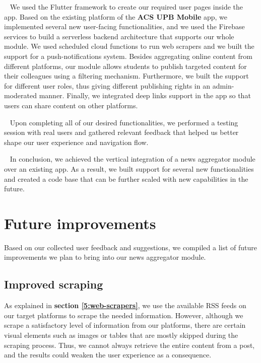 ~
We used the Flutter framework to create our required user pages inside the app. Based on the existing platform of the \textbf{ACS UPB Mobile} app, we implemented several new user-facing functionalities, and we used the Firebase services to build a serverless backend architecture that supports our whole module. We used scheduled cloud functions to run web scrapers and we built the support for a push-notifications system. Besides aggregating online content from different platforms, our module allows students to publish targeted content for their colleagues using a filtering mechanism. Furthermore, we built the support for different user roles, thus giving different publishing rights in an admin-moderated manner. Finally, we integrated deep links support in the app so that users can share content on other platforms. 

~
Upon completing all of our desired functionalities, we performed a testing session with real users and gathered relevant feedback that helped us better shape our user experience and navigation flow.

~
In conclusion, we achieved the vertical integration of a news aggregator module over an existing app. As a result, we built support for several new functionalities and created a code base that can be further scaled with new capabilities in the future.
 
\section{Future improvements} \label{7:future_improvements}

Based on our collected user feedback and suggestions, we compiled a list of future improvements we plan to bring into our news aggregator module.

\subsection{Improved scraping}

As explained in \textbf{section \ref{5:web-scrapers}}, we use the available RSS feeds on our target platforms to scrape the needed information. However, although we scrape a satisfactory level of information from our platforms, there are certain visual elements such as images or tables that are mostly skipped during the scraping process. Thus, we cannot always retrieve the entire content from a post, and the results could weaken the user experience as a consequence. 

